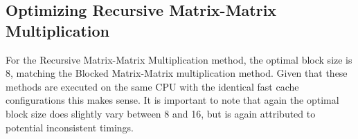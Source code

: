 \documentclass{article}
\begin{document}
\begin{table}[ht!]
    \caption{Recursive with Intermediates Matrix-Matrix Multiplication Timings (Seconds) on NOTS}
    \centering
\end{table}

\subsection{Optimizing Recursive Matrix-Matrix Multiplication}
For the Recursive Matrix-Matrix Multiplication method, the optimal block size is 8, matching the Blocked Matrix-Matrix multiplication method. Given that these methods are executed on the same CPU with the identical fast cache configurations this makes sense. It is important to note that again the optimal block size does slightly vary between 8 and 16, but is again attributed to potential inconsistent timings. 
\end{document}
